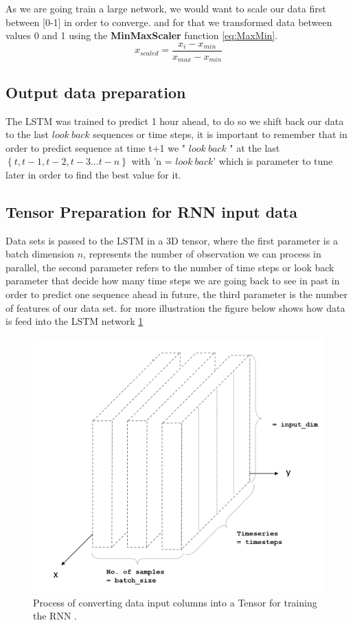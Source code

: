 As we are going train a large network, we would want to scale our data first between [0-1] in order to converge. and for that we transformed data between values 0 and 1 \cite{Chatterjee2017} using the \textbf{MinMaxScaler} function \ref{eq:MaxMin}.
%
\begin{equation}
\label{eq:MaxMin}
x_{scaled} = \frac{x_{i} - x_{min}}{x_{max} - x_{min}}
\end{equation}
%

\subsection{Output data preparation}
The LSTM was trained to predict 1 hour ahead, to do so we shift back our data to the last $look\ back$ sequences or time steps, it is important to remember that in order to predict sequence at time t+1 we " $look\ back$ "  at the last \in$ \left\{t,t-1,t-2,t-3...t-n\right\}$ with 'n = $look\ back$'  which is parameter to tune later in order to find the best value for it.


\subsection{Tensor Preparation for RNN input data}
Data sets is passed to the LSTM in a 3D tensor, where the first parameter is a batch dimension $n$, represents the number of observation we can process in parallel, the second parameter refers to the number of time steps or look back parameter that decide how many time steps we are going back to see in past in order to predict one sequence ahead in future, the third parameter is the number of features of our data set. for more illustration the figure below shows how data is feed into the LSTM network \ref{fig:tensor-tables} 
  
%
\begin{figure}[H]
\centering
\includegraphics[scale=.45]{img/tensor.PNG}  
\caption{Process of converting data input columns into a Tensor for training the RNN \cite{tensor}.}
\label{fig:tensor-tables}
\end{figure}
%

